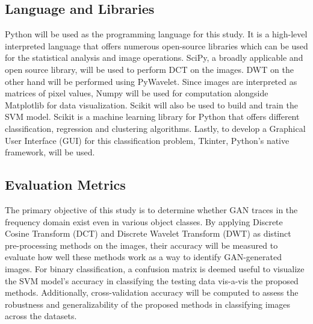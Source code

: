 \documentclass{icsthesis}
\begin{document}
\begin{mainmatter}
\subsection{Language and Libraries}
Python will be used as the programming language for this study. It is a high-level interpreted language that offers numerous open-source libraries which can be used for the statistical analysis and image operations. SciPy, a broadly applicable and open source library, will be used to perform DCT on the images. DWT on the other hand will be performed using PyWavelet. Since images are interpreted as matrices of pixel values, Numpy will be used for computation alongside Matplotlib for data visualization. Scikit will also be used to build and train the SVM model. Scikit is a machine learning library for Python that offers different classification, regression and clustering algorithms. Lastly, to develop a Graphical User Interface (GUI) for this classification problem, Tkinter, Python’s native framework, will be used.

\subsection{Evaluation Metrics}
The primary objective of this study is to determine whether GAN traces in the frequency domain exist even in various object classes. By applying Discrete Cosine Transform (DCT) and Discrete Wavelet Transform (DWT) as distinct pre-processing methods on the images, their accuracy will be measured to evaluate how well these methods work as a way to identify GAN-generated images. For binary classification, a confusion matrix is deemed useful to visualize the SVM model's accuracy in classifying the testing data vis-a-vis the proposed methods. Additionally, cross-validation accuracy will be computed to assess the robustness and generalizability of the proposed methods in classifying images across the datasets.




		

\end{mainmatter}
\end{document}
